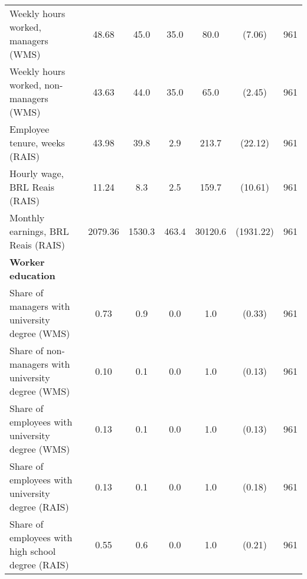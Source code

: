 {\begin{tabular}{l*{1}{cccccc}}
Weekly hours worked, managers (WMS)&       48.68&        45.0&        35.0&        80.0&      (7.06)&         961\\
Weekly hours worked, non-managers (WMS)&       43.63&        44.0&        35.0&        65.0&      (2.45)&         961\\
Employee tenure, weeks (RAIS)&       43.98&        39.8&         2.9&       213.7&     (22.12)&         961\\
Hourly wage, BRL Reais (RAIS)&       11.24&         8.3&         2.5&       159.7&     (10.61)&         961\\
Monthly earnings, BRL Reais (RAIS)&     2079.36&      1530.3&       463.4&     30120.6&   (1931.22)&         961\\
\textbf{Worker education}&            &            &            &            &            &            \\
Share of managers with university degree (WMS)&        0.73&         0.9&         0.0&         1.0&      (0.33)&         961\\
Share of non-managers with university degree (WMS)&        0.10&         0.1&         0.0&         1.0&      (0.13)&         961\\
Share of employees with university degree (WMS)&        0.13&         0.1&         0.0&         1.0&      (0.13)&         961\\
Share of employees with university degree (RAIS)&        0.13&         0.1&         0.0&         1.0&      (0.18)&         961\\
Share of employees with high school degree (RAIS)&        0.55&         0.6&         0.0&         1.0&      (0.21)&         961\\
\bottomrule
\end{tabular}
}
